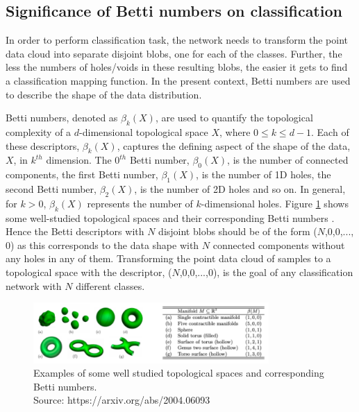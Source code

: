 \documentclass[wcp]{jmlr}
\begin{document}
\subsection{Significance of Betti numbers on classification}
In order to perform classification task, the network needs to transform the point data cloud into separate disjoint blobs, one for each of the classes. Further, the less the numbers of holes/voids in these resulting blobs, the easier it gets to find a classification mapping function. In the present context, Betti numbers \cite{betti_number} are used to describe the shape of the data distribution.

Betti numbers, denoted as $\beta_k(X)$,   are used to quantify the topological complexity of a $d$-dimensional topological space  $X$, where  $0 \leq k \leq d-1$. Each of these descriptors, $\beta_k(X)$, captures the defining aspect of the shape of the data, $X$, in $k^{th}$ dimension. The  $0^{th}$ Betti number, $\beta_0(X)$, is the number of connected components, the first Betti number, $\beta_1(X)$, is the number of 1D holes, the second Betti number, $\beta_2(X)$, is the number of 2D holes and so on. In general, for $k>0$, $\beta_k(X)$ represents the number of $k$-dimensional holes. Figure \ref{fig:bett_numbers_illustration} shows some well-studied topological spaces and their corresponding Betti numbers \cite{naitzat2020topology}. Hence the Betti descriptors with $N$ disjoint blobs  should be of the form ($N$,0,0,..., 0) as this corresponds to the data shape with $N$ connected components without any holes in any of them. Transforming the point data cloud of samples  to a topological space with the  descriptor, ($N$,0,0,...,0), is the goal of any classification network with $N$ different classes.

\begin{figure}[htp]
\begin{center}
\includegraphics[width=0.8\textwidth]{images/bett_numbers_illustration.png}
\caption{Examples of some well studied topological spaces and corresponding Betti numbers.\\ \footnotesize{Source: https://arxiv.org/abs/2004.06093}}
\label{fig:bett_numbers_illustration}
\end{center}
\end{figure}
\end{document}
